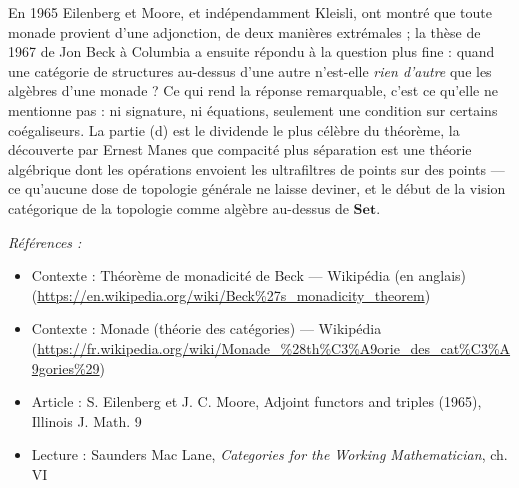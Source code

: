 \documentclass[11pt]{article}
\newenvironment{refs}{\par\small\noindent\emph{Références :}\begin{itemize}\setlength\itemsep{0pt}}{\end{itemize}\normalsize}
\begin{document}
\noindent En 1965 Eilenberg et Moore, et indépendamment Kleisli, ont montré que toute
monade provient d'une adjonction, de deux manières extrémales ; la thèse de 1967 de Jon Beck à
Columbia a ensuite répondu à la question plus fine : quand une catégorie de structures au-dessus
d'une autre n'est-elle \textit{rien d'autre} que les algèbres d'une monade ? Ce qui rend la réponse
remarquable, c'est ce qu'elle ne mentionne pas : ni signature, ni équations, seulement une
condition sur certains coégaliseurs. La partie (d) est le dividende le plus célèbre du théorème,
la découverte par Ernest Manes que compacité plus séparation est une théorie algébrique dont les
opérations envoient les ultrafiltres de points sur des points --- ce qu'aucune dose de topologie
générale ne laisse deviner, et le début de la vision catégorique de la topologie comme algèbre
au-dessus de $ \mathbf{Set} $.

\begin{refs}
\item Contexte : Théorème de monadicité de Beck --- Wikipédia (en anglais) (\url{https://en.wikipedia.org/wiki/Beck%27s_monadicity_theorem})
\item Contexte : Monade (théorie des catégories) --- Wikipédia (\url{https://fr.wikipedia.org/wiki/Monade_%28th%C3%A9orie_des_cat%C3%A9gories%29})
\item Article : S. Eilenberg et J. C. Moore, \og{} Adjoint functors and triples \fg{} (1965), Illinois J. Math. 9
\item Lecture : Saunders Mac Lane, \textit{Categories for the Working Mathematician}, ch. VI
\end{refs}

\bigskip
\end{document}

